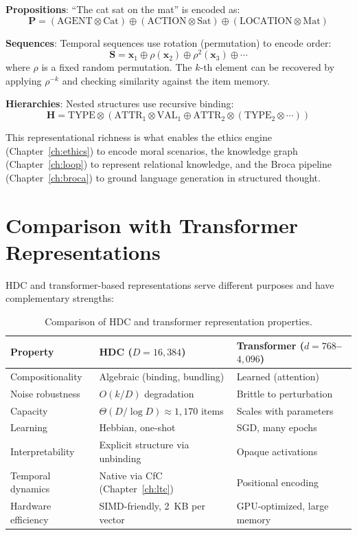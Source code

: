 \documentclass[12pt]{book}
\newcommand{\bind}{\otimes}
\newcommand{\bundle}{\oplus}
\begin{document}
\textbf{Propositions}: ``The cat sat on the mat'' is encoded as:
\begin{equation}
\mathbf{P} = (\text{AGENT} \bind \text{Cat}) \bundle (\text{ACTION} \bind \text{Sat}) \bundle (\text{LOCATION} \bind \text{Mat})
\end{equation}

\textbf{Sequences}: Temporal sequences use rotation (permutation) to encode order:
\begin{equation}
\mathbf{S} = \mathbf{x}_1 \bundle \rho(\mathbf{x}_2) \bundle \rho^2(\mathbf{x}_3) \bundle \cdots
\end{equation}
where $\rho$ is a fixed random permutation. The $k$-th element can be recovered by applying $\rho^{-k}$ and checking similarity against the item memory.

\textbf{Hierarchies}: Nested structures use recursive binding:
\begin{equation}
\mathbf{H} = \text{TYPE} \bind (\text{ATTR}_1 \bind \text{VAL}_1 \bundle \text{ATTR}_2 \bind (\text{TYPE}_2 \bind \cdots))
\end{equation}

This representational richness is what enables the ethics engine (Chapter~\ref{ch:ethics}) to encode moral scenarios, the knowledge graph (Chapter~\ref{ch:loop}) to represent relational knowledge, and the Broca pipeline (Chapter~\ref{ch:broca}) to ground language generation in structured thought.

\section{Comparison with Transformer Representations}

HDC and transformer-based representations serve different purposes and have complementary strengths:

\begin{table}[H]
\centering
\caption{Comparison of HDC and transformer representation properties.}
\label{tab:hdc-transformer}
\begin{tabular}{lll}
\toprule
\textbf{Property} & \textbf{HDC ($D = 16{,}384$)} & \textbf{Transformer ($d = 768$--$4{,}096$)} \\
\midrule
Compositionality & Algebraic (binding, bundling) & Learned (attention) \\
Noise robustness & $O(k/D)$ degradation & Brittle to perturbation \\
Capacity & $\Theta(D/\log D) \approx 1{,}170$ items & Scales with parameters \\
Learning & Hebbian, one-shot & SGD, many epochs \\
Interpretability & Explicit structure via unbinding & Opaque activations \\
Temporal dynamics & Native via CfC (Chapter~\ref{ch:ltc}) & Positional encoding \\
Hardware efficiency & SIMD-friendly, 2~KB per vector & GPU-optimized, large memory \\
\bottomrule
\end{tabular}
\end{table}
\end{document}
